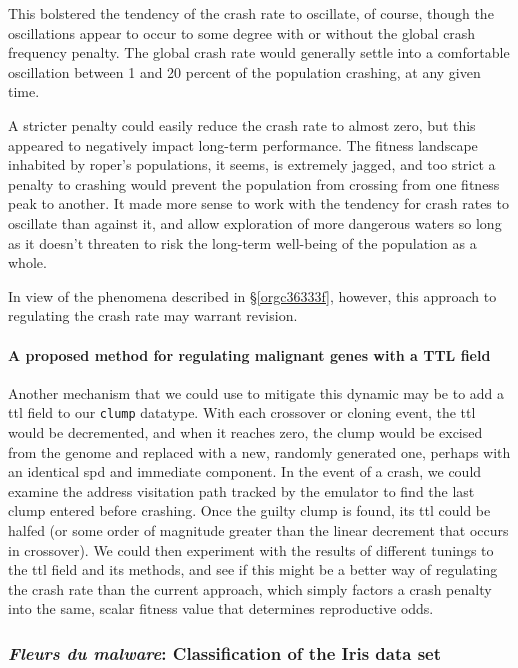 \documentclass[12pt,glossary]{dalthesis}
\begin{document}
This bolstered the tendency of the crash rate to oscillate, of course, though
the oscillations appear to occur to some degree with or without the global
crash frequency penalty. The global crash rate would generally settle into
a comfortable oscillation between 1 and 20 percent of the population crashing,
at any given time. 

A stricter penalty could easily reduce the crash rate to almost zero, but
this appeared to negatively impact long-term performance. The fitness landscape
inhabited by \gls{roper}'s populations, it seems, is extremely jagged, and
too strict a penalty to crashing would prevent the population from crossing 
from one fitness peak to another. It made more sense to work with the tendency
for crash rates to oscillate than against it, and allow exploration of more
dangerous waters so long as it doesn't threaten to risk the long-term well-being
of the population as a whole. 

In view of the phenomena described in \S \ref{orgc36333f}, however, this approach to regulating the crash rate may warrant revision. 

\paragraph{A proposed method for regulating malignant genes with a TTL field}
\label{sec:org3a78b94}
\label{org2336a95}

Another mechanism that we could use to mitigate this dynamic may be to add
a \gls{ttl} field to our \texttt{clump} datatype. With each crossover or cloning event, 
the \gls{ttl} would be decremented, and when it reaches zero, the clump would be
excised from the genome and replaced with a new, randomly generated one, perhaps
with an identical \gls{spd} and immediate component. In the event of a crash, we
could examine the address visitation path tracked by the emulator to find the 
last clump entered before crashing. Once the guilty clump is found, its \gls{ttl}
could be halfed (or some order of magnitude greater than the linear decrement
that occurs in crossover). We could then experiment with the results of different
tunings to the \gls{ttl} field and its methods, and see if this might be a better
way of regulating the crash rate than the current approach, which simply factors
a crash penalty into the same, scalar fitness value that determines reproductive
odds. 


\subsubsection{\emph{Fleurs du malware}: Classification of the Iris data set}
\label{sec:orga8bb748}
\label{org7f24cb5}
\end{document}
